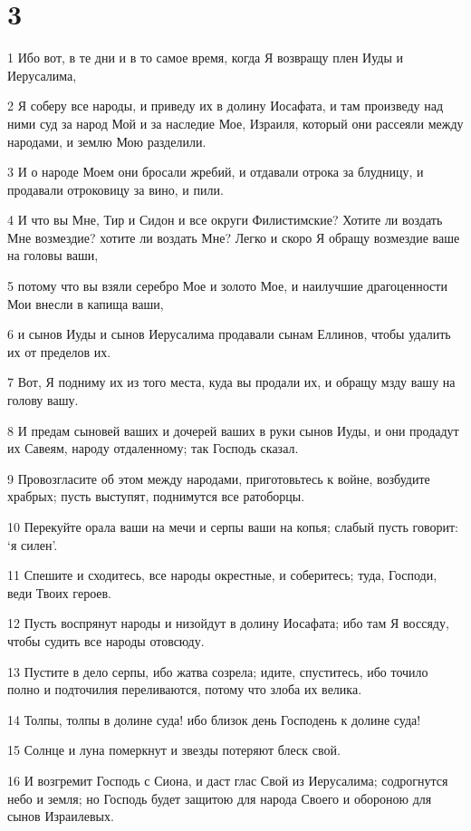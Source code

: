 \chapter{3}

\par 1 Ибо вот, в те дни и в то самое время, когда Я возвращу плен Иуды и Иерусалима,
\par 2 Я соберу все народы, и приведу их в долину Иосафата, и там произведу над ними суд за народ Мой и за наследие Мое, Израиля, который они рассеяли между народами, и землю Мою разделили.
\par 3 И о народе Моем они бросали жребий, и отдавали отрока за блудницу, и продавали отроковицу за вино, и пили.
\par 4 И что вы Мне, Тир и Сидон и все округи Филистимские? Хотите ли воздать Мне возмездие? хотите ли воздать Мне? Легко и скоро Я обращу возмездие ваше на головы ваши,
\par 5 потому что вы взяли серебро Мое и золото Мое, и наилучшие драгоценности Мои внесли в капища ваши,
\par 6 и сынов Иуды и сынов Иерусалима продавали сынам Еллинов, чтобы удалить их от пределов их.
\par 7 Вот, Я подниму их из того места, куда вы продали их, и обращу мзду вашу на голову вашу.
\par 8 И предам сыновей ваших и дочерей ваших в руки сынов Иуды, и они продадут их Савеям, народу отдаленному; так Господь сказал.
\par 9 Провозгласите об этом между народами, приготовьтесь к войне, возбудите храбрых; пусть выступят, поднимутся все ратоборцы.
\par 10 Перекуйте орала ваши на мечи и серпы ваши на копья; слабый пусть говорит: `я силен'.
\par 11 Спешите и сходитесь, все народы окрестные, и соберитесь; туда, Господи, веди Твоих героев.
\par 12 Пусть воспрянут народы и низойдут в долину Иосафата; ибо там Я воссяду, чтобы судить все народы отовсюду.
\par 13 Пустите в дело серпы, ибо жатва созрела; идите, спуститесь, ибо точило полно и подточилия переливаются, потому что злоба их велика.
\par 14 Толпы, толпы в долине суда! ибо близок день Господень к долине суда!
\par 15 Солнце и луна померкнут и звезды потеряют блеск свой.
\par 16 И возгремит Господь с Сиона, и даст глас Свой из Иерусалима; содрогнутся небо и земля; но Господь будет защитою для народа Своего и обороною для сынов Израилевых.
